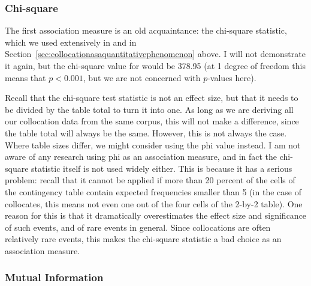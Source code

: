 \subsubsection{Chi-square}
\label{sec:amchisquare}

The first association  measure  is an old acquaintance: the chi-square  statistic, which we used extensively in  and in Section~\ref{sec:collocationasaquantitativephenomenon} above. I will not demonstrate it again, but the chi-square value for  would be 378.95 (at 1 degree of freedom this means that $p < 0.001$, but we are not concerned with $p$-values here).

Recall that the chi-square  test statistic is not an effect size,  but that it needs to be divided by the table total to turn it into one. As long as we are deriving all our collocation  data from the same corpus, this will not make a difference, since the table total will always be the same. However, this is not always the case. Where table sizes differ, we might consider using the phi value instead. I am not aware of any research using phi as an association  measure,  and in fact the chi-square  statistic itself is not used widely either. This is because it has a serious problem: recall that it cannot be applied if more than 20 percent of the cells of the contingency  table contain expected  frequencies smaller than 5 (in the case of collocates,  this means not even one out of the four cells of the 2-by-2 table). One reason for this is that it dramatically overestimates the effect size  and significance  of such events, and of rare events in general. Since collocations are often relatively rare events, this makes the chi-square  statistic a bad choice as an association   measure.

\subsubsection{Mutual Information}
\label{sec:ammutualinformation}

